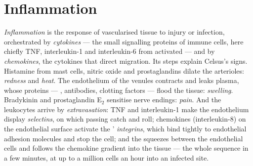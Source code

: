 \section{Inflammation}

\begin{definition}\label{def:b3:innate-immunity:inflammation}
\emph{Inflammation} is the response of vascularised tissue to injury or
infection, orchestrated by \emph{cytokines} --- the small signalling
proteins of immune cells, here chiefly TNF, interleukin-1 and
interleukin-6 from activated  --- and by \emph{chemokines},
the cytokines that direct migration. Its steps explain Celsus's signs.
Histamine from mast cells, nitric oxide and prostaglandins dilate the
arterioles: \emph{redness} and \emph{heat}. The endothelium of the
venules contracts and leaks plasma, whose proteins --- ,
antibodies, clotting factors --- flood the tissue: \emph{swelling}.
Bradykinin and prostaglandin E$_{2}$ sensitise nerve endings:
\emph{pain}. And the leukocytes arrive by \emph{extravasation}: TNF and
interleukin-1 make the endothelium display \emph{selectins}, on which
passing  catch and roll; chemokines (interleukin-8) on the
endothelial surface activate the ' \emph{integrins}, which
bind tightly to endothelial adhesion molecules and stop the cell; and
the  squeezes between the endothelial cells and follows the
chemokine gradient into the tissue --- the whole sequence in a few
minutes, at up to a million cells an hour into an infected site.
\end{definition}

